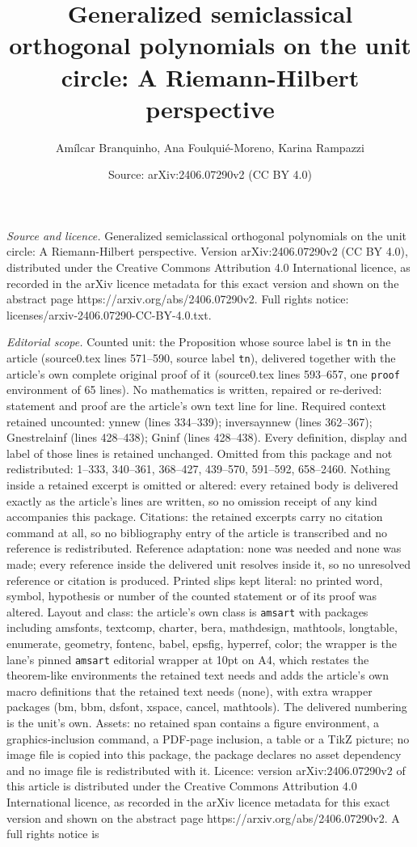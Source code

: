 \documentclass[10pt,a4paper]{amsart}
\title[Generalized semiclassical orthogonal polynomials on the unit]{Generalized semiclassical orthogonal polynomials on the unit circle: A Riemann-Hilbert perspective}
\author{Am\'ilcar Branquinho, Ana Foulqui\'e-Moreno, Karina Rampazzi}
\date{Source: arXiv:2406.07290v2 (CC BY 4.0)}
\begin{document}
\maketitle

\noindent\emph{Source and licence.} Generalized semiclassical orthogonal polynomials on the unit circle: A Riemann-Hilbert perspective. Version arXiv:2406.07290v2 (CC BY 4.0), distributed under the Creative Commons Attribution 4.0 International licence, as recorded in the arXiv licence metadata for this exact version and shown on the abstract page https://arxiv.org/abs/2406.07290v2. Full rights notice: licenses/arxiv-2406.07290-CC-BY-4.0.txt.\par\smallskip

\noindent\textit{Editorial scope.} Counted unit: the Proposition whose source label is \texttt{tn} in the article (source0.tex lines 571--590, source label \texttt{tn}), delivered together with the article's own complete original proof of it (source0.tex lines 593--657, one \texttt{proof} environment of 65 lines). No mathematics is written, repaired or re-derived: statement and proof are the article's own text line for line. Required context retained uncounted: ynnew (lines 334--339); inversaynnew (lines 362--367); Gnestrelainf (lines 428--438); Gninf (lines 428--438). Every definition, display and label of those lines is retained unchanged. Omitted from this package and not redistributed: 1--333, 340--361, 368--427, 439--570, 591--592, 658--2460. Nothing inside a retained excerpt is omitted or altered: every retained body is delivered exactly as the article's lines are written, so no omission receipt of any kind accompanies this package. Citations: the retained excerpts carry no citation command at all, so no bibliography entry of the article is transcribed and no reference is redistributed. Reference adaptation: none was needed and none was made; every reference inside the delivered unit resolves inside it, so no unresolved reference or citation is produced. Printed slips kept literal: no printed word, symbol, hypothesis or number of the counted statement or of its proof was altered. Layout and class: the article's own class is \texttt{amsart} with packages including amsfonts, textcomp, charter, bera, mathdesign, mathtools, longtable, enumerate, geometry, fontenc, babel, epsfig, hyperref, color; the wrapper is the lane's pinned \texttt{amsart} editorial wrapper at 10pt on A4, which restates the theorem-like environments the retained text needs and adds the article's own macro definitions that the retained text needs (none), with extra wrapper packages (bm, bbm, dsfont, xspace, cancel, mathtools). The delivered numbering is the unit's own. Assets: no retained span contains a figure environment, a graphics-inclusion command, a PDF-page inclusion, a table or a TikZ picture; no image file is copied into this package, the package declares no asset dependency and no image file is redistributed with it. Licence: version arXiv:2406.07290v2 of this article is distributed under the Creative Commons Attribution 4.0 International licence, as recorded in the arXiv licence metadata for this exact version and shown on the abstract page https://arxiv.org/abs/2406.07290v2. A full rights notice is 
\end{document}

